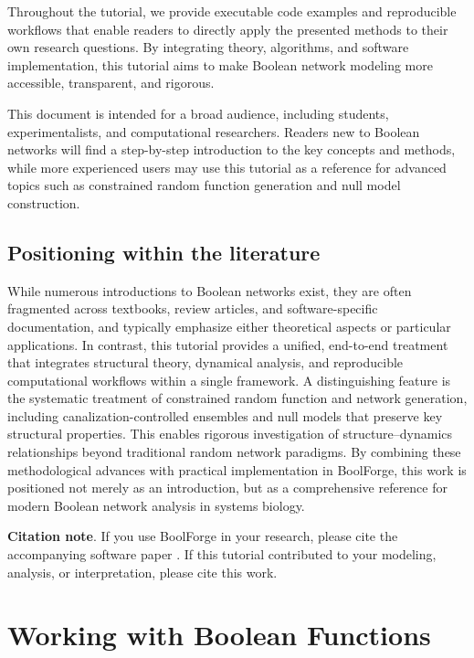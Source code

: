 \documentclass[
]{article}
\begin{document}
Throughout the tutorial, we provide executable code examples and
reproducible workflows that enable readers to directly apply the
presented methods to their own research questions. By integrating
theory, algorithms, and software implementation, this tutorial aims to
make Boolean network modeling more accessible, transparent, and
rigorous.

This document is intended for a broad audience, including students,
experimentalists, and computational researchers. Readers new to Boolean
networks will find a step-by-step introduction to the key concepts and
methods, while more experienced users may use this tutorial as a
reference for advanced topics such as constrained random function
generation and null model construction.

\subsection*{Positioning within the
literature}\label{positioning-within-the-literature}

While numerous introductions to Boolean networks exist, they are often
fragmented across textbooks, review articles, and software-specific
documentation, and typically emphasize either theoretical aspects or
particular applications. In contrast, this tutorial provides a unified,
end-to-end treatment that integrates structural theory, dynamical
analysis, and reproducible computational workflows within a single
framework. A distinguishing feature is the systematic treatment of
constrained random function and network generation, including
canalization-controlled ensembles and null models that preserve key
structural properties. This enables rigorous investigation of
structure--dynamics relationships beyond traditional random network
paradigms. By combining these methodological advances with practical
implementation in BoolForge, this work is positioned not merely as an
introduction, but as a comprehensive reference for modern Boolean
network analysis in systems biology.

\textbf{Citation note}. If you use BoolForge in your research, please
cite the accompanying software paper \citep{kadelka2025boolforge}. If
this tutorial contributed to your modeling, analysis, or interpretation,
please cite this work.

\section{Working with Boolean
Functions}\label{working-with-boolean-functions}
\end{document}
